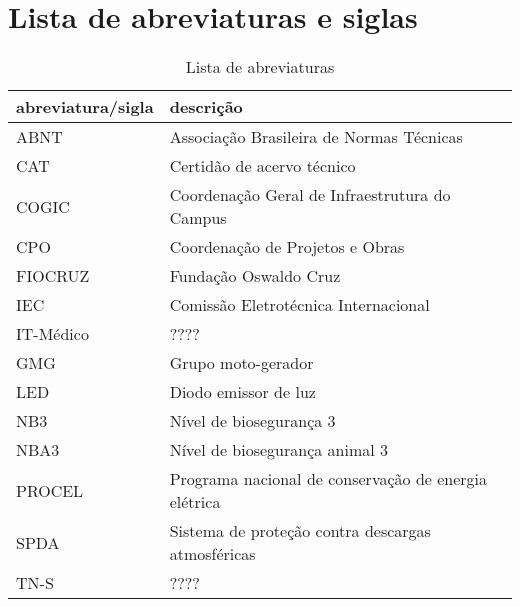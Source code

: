 \section*{Lista de abreviaturas e siglas} \label{section: abbreviations}

\begin{table}[ht]
\centering
\caption{Lista de abreviaturas}
\begin{tabular}[t]
{m{}m{}}
\toprule
\textbf{abreviatura/sigla}&\textbf{descrição}\\
\midrule
ABNT & Associação Brasileira de Normas Técnicas\\
CAT & Certidão de acervo técnico\\
COGIC & Coordenação Geral de Infraestrutura do Campus\\
CPO & Coordenação de Projetos e Obras\\
FIOCRUZ & Fundação Oswaldo Cruz\\
IEC & Comissão Eletrotécnica Internacional\\
IT-Médico & ????\\
GMG & Grupo moto-gerador \\
LED & Diodo emissor de luz \\
NB3 & Nível de biosegurança 3\\
NBA3 & Nível de biosegurança animal 3\\
PROCEL & Programa nacional de conservação de energia elétrica\\
SPDA & Sistema de proteção contra descargas atmosféricas\\
TN-S & ????\\
\bottomrule
\end{tabular}
\end{table}